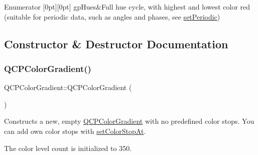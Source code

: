 \begin{DoxyEnumFields}{Enumerator}
[0pt][0pt]{}\mbox{\label{class_q_c_p_color_gradient_aed6569828fee337023670272910c9072aa9382f15c19d131045d8ee3b4a40b799}} 
gp\+Hues&Full hue cycle, with highest and lowest color red (suitable for periodic data, such as angles and phases, see \hyperlink{class_q_c_p_color_gradient_a39d6448155fc00a219f239220d14bb39}{set\+Periodic}) \\
\hline

\end{DoxyEnumFields}


\subsection{Constructor \& Destructor Documentation}
\mbox{\label{class_q_c_p_color_gradient_a96bcc490ff9dc32b22941ce00800bce0}} 
\subsubsection{\texorpdfstring{Q\+C\+P\+Color\+Gradient()}{QCPColorGradient()}\hspace{0.1cm}{\footnotesize\ttfamily [1/2]}}
{\footnotesize\ttfamily Q\+C\+P\+Color\+Gradient\+::\+Q\+C\+P\+Color\+Gradient (\begin{DoxyParamCaption}{ }\end{DoxyParamCaption})}

Constructs a new, empty \hyperlink{class_q_c_p_color_gradient}{Q\+C\+P\+Color\+Gradient} with no predefined color stops. You can add own color stops with \hyperlink{class_q_c_p_color_gradient_a3b48be5e78079db1bb2a1188a4c3390e}{set\+Color\+Stop\+At}.

The color level count is initialized to 350. \mbox{\label{class_q_c_p_color_gradient_a4e570b4004fd60bd135e52d685ed2b66}} 
